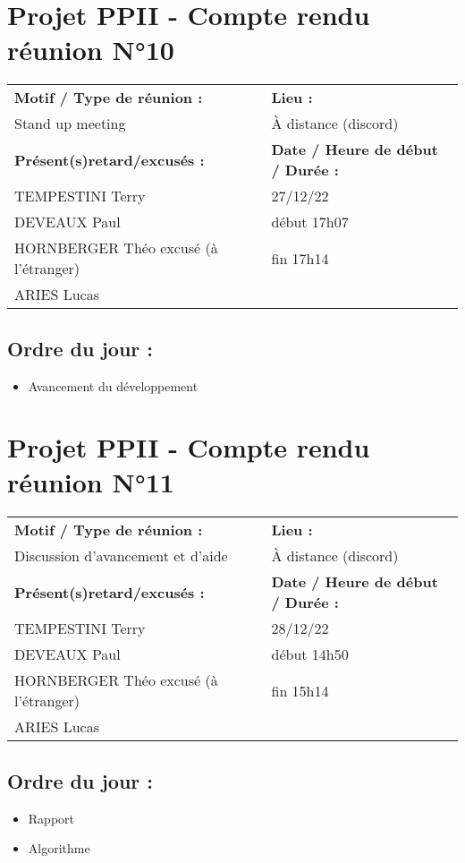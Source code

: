\documentclass[12pt,titlepage]{report}
\begin{document}
\section*{Projet PPII - Compte rendu réunion N°10}
\begin{tabular}{|p{7cm}|p{6cm}|}
    \hline
    \textbf{Motif / Type de réunion :}
    & \textbf{Lieu :}
    \\
    Stand up meeting
    & 
    À distance (discord)
    \\ \hline
    \textbf{Présent(s)retard/excusés :}
    &
    \textbf{Date / Heure de début / Durée :}
    \\ 
    TEMPESTINI Terry &  27/12/22\\  
    DEVEAUX Paul & début 17h07\\
    HORNBERGER Théo excusé (à l'étranger) & fin 17h14\\
    ARIES Lucas & 
    \\ \hline
\end{tabular}

\subsection*{Ordre du jour :}
\begin{itemize}
    \item{Avancement du développement}
\end{itemize}
\newpage

\section*{Projet PPII - Compte rendu réunion N°11}
\begin{tabular}{|p{7cm}|p{6cm}|}
    \hline
    \textbf{Motif / Type de réunion :}
    & \textbf{Lieu :}
    \\
    Discussion d'avancement et d'aide
    & 
    À distance (discord)
    \\ \hline
    \textbf{Présent(s)retard/excusés :}
    &
    \textbf{Date / Heure de début / Durée :}
    \\ 
    TEMPESTINI Terry &  28/12/22\\  
    DEVEAUX Paul & début 14h50\\
    HORNBERGER Théo excusé (à l'étranger) & fin 15h14\\
    ARIES Lucas & 
    \\ \hline
\end{tabular}

\subsection*{Ordre du jour :}
\begin{itemize}
    \item{Rapport}
    \item{Algorithme}
\end{itemize}
\end{document}
